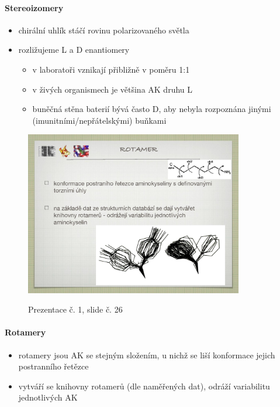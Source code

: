 \documentclass[DIV=8]{scrreprt}
\begin{document}
\paragraph{Stereoizomery}
\begin{itemize}[nosep]
    \item chirální uhlík stáčí rovinu polarizovaného světla
    \item rozližujeme L a D enantiomery
\begin{itemize}[nosep]
    \item v laboratoři vznikají přibližně v poměru 1:1
    \item v živých organismech je většina AK druhu L
    \item buněčná stěna baterií bývá často D, aby nebyla rozpoznána jinými (imunitními/nepřátelskými) buňkami
\end{itemize}

\end{itemize}



\begin{figure}
    \caption{Prezentace č. 1, slide č. 26}
    \includegraphics[width=0.85\textwidth]{slides-1/slide-26.jpg}
    \centering
    \label{slides-1-slide-26}
\end{figure}

\paragraph{Rotamery}
\begin{itemize}[nosep]
    \item rotamery jsou AK se stejným složením, u nichž se liší konformace jejich postranního řetězce
    \item vytváří se knihovny rotamerů (dle naměřených dat), odráží variabilitu jednotlivých AK
\end{itemize}
\end{document}
